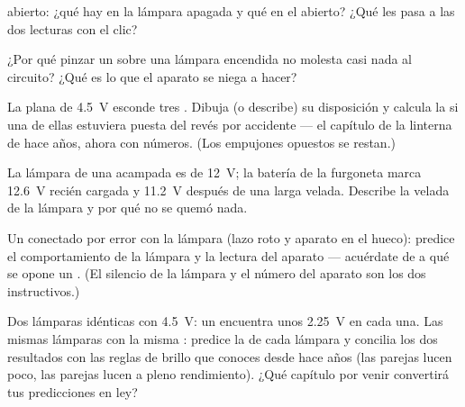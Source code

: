 \begin{exercise}[$\star$]\label{exo:g8:voltage-voltmeter:7}
 abierto: ¿qué hay en la lámpara apagada y qué en el
 abierto? ¿Qué les pasa a las dos lecturas con el
clic?
\end{exercise}

\begin{exercise}[$\star$]\label{exo:g8:voltage-voltmeter:8}
¿Por qué pinzar un  sobre una lámpara encendida no
molesta casi nada al circuito? ¿Qué es lo que el aparato se niega a
hacer?
\end{exercise}

\begin{exercise}[$\star\star$]\label{exo:g8:voltage-voltmeter:9}
La  plana de \qty{4.5}{V} esconde tres . Dibuja (o
describe) su disposición y calcula la  si una de ellas
estuviera puesta del revés por accidente --- el capítulo de la linterna
de hace años, ahora con números. (Los empujones opuestos se restan.)
\end{exercise}

\begin{exercise}[$\star\star$]\label{exo:g8:voltage-voltmeter:10}
La lámpara de una acampada es de \qty{12}{V}; la batería de la
furgoneta marca \qty{12.6}{V} recién cargada y \qty{11.2}{V} después de
una larga velada. Describe la velada de la lámpara y por qué no se
quemó nada.
\end{exercise}

\begin{exercise}[$\star\star$]\label{exo:g8:voltage-voltmeter:11}
Un  conectado por error \emph{} con la
lámpara (lazo roto y aparato en el hueco): predice el comportamiento de
la lámpara y la lectura del aparato --- acuérdate de a qué se opone un
. (El silencio de la lámpara y el número del aparato
son los dos instructivos.)
\end{exercise}

\begin{exercise}[$\star\star\star$]\label{exo:g8:voltage-voltmeter:12}
Dos lámparas idénticas  con \qty{4.5}{V}: un
 encuentra unos \qty{2.25}{V} en cada una. Las mismas
lámparas  con la misma : predice la
 de cada lámpara y concilia los dos resultados con las
reglas de brillo que conoces desde hace años (las parejas 
lucen poco, las parejas  lucen a pleno rendimiento). ¿Qué
capítulo por venir convertirá tus predicciones en ley?
\end{exercise}

